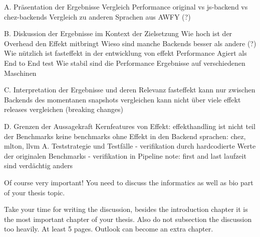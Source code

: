 		
A. Präsentation der Ergebnisse
    Vergleich Performance original vs js-backend vs chez-backends
    Vergleich zu anderen Sprachen aus AWFY (?)
    
B. Diskussion der Ergebnisse im Kontext der Zielsetzung
    Wie hoch ist der Overhead den Effekt mitbringt
    Wieso sind manche Backends besser als andere (?)
    Wie nützlich ist fasteffekt in der entwicklung von effekt
        Performance
        Agiert als End to End test
    Wie stabil sind die Performance Ergebnisse auf verschiedenen Maschinen
    
    
C. Interpretation der Ergebnisse und deren Relevanz
    fasteffekt kann nur zwischen Backends des momentanen snapshots vergleichen
    kann nicht über viele effekt releases vergleichen (breaking changes)

D. Grenzen der Aussagekraft
    Kernfeatures von Effekt: effekthandling ist nicht teil der Benchmarks
    keine benchmarks ohne Effekt in den Backend sprachen: chez, mlton, llvm
    A. Teststrategie und Testfälle
        - verifikation durch hardcodierte Werte der originalen Benchmarks
        - verifikation in Pipeline	
        note: first and last laufzeit sind verdächtig anders

Of course very important! You need to discuss the informatics as well as bio part of your thesis topic.

\bigskip
Take your time for writing the discussion, besides the introduction chapter it is the most important chapter of your thesis.
Also do not subsection the discussion too heavily.
At least 5 pages.
Outlook can become an extra chapter.
